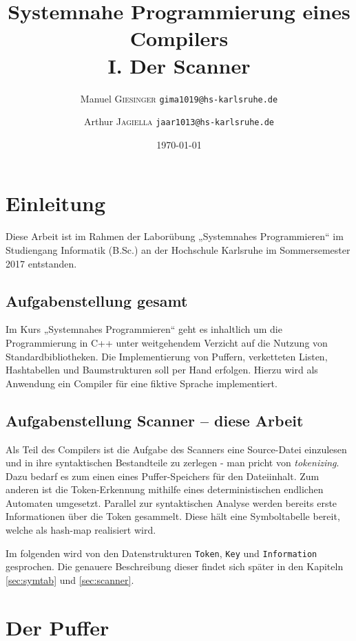 \documentclass[
a4paper,   %
11pt,      %
oneside,   %
onecolumn, %
final      %
]{article}
\title{Systemnahe Programmierung eines Compilers\\I. Der Scanner}
\author{
Manuel \textsc{Giesinger} \hspace{1cm} \texttt{gima1019@hs-karlsruhe.de}
\and
Arthur \textsc{Jagiella} \hspace{1.35cm} \texttt{jaar1013@hs-karlsruhe.de}
}
\date{\today}
\newcommand{\code}[1]{\lstinline$#1$}
\begin{document}
\maketitle
\newpage

\tableofcontents
\newpage



\section{Einleitung} %
Diese Arbeit ist im Rahmen der Laborübung „Systemnahes Programmieren“ im Studiengang Informatik (B.Sc.) an der Hochschule Karlsruhe im Sommersemester 2017 entstanden. 

\subsection{Aufgabenstellung gesamt}
Im Kurs „Systemnahes Programmieren“ geht es inhaltlich um die Programmierung in C++ unter weitgehendem Verzicht auf die Nutzung von Standardbibliotheken. Die Implementierung von Puffern, verketteten Listen, Hashtabellen und Baumstrukturen soll per Hand erfolgen. Hierzu wird als Anwendung ein Compiler für eine fiktive Sprache implementiert.

\subsection{Aufgabenstellung Scanner -- diese Arbeit} 
Als Teil des Compilers ist die Aufgabe des Scanners eine Source-Datei einzulesen und in ihre syntaktischen Bestandteile zu zerlegen - man pricht von \emph{tokenizing}. Dazu bedarf es zum einen eines Puffer-Speichers für den Dateiinhalt. Zum anderen ist die Token-Erkennung mithilfe eines deterministischen endlichen Automaten umgesetzt.
Parallel zur syntaktischen Analyse werden bereits erste Informationen über die Token gesammelt. Diese hält eine Symboltabelle bereit, welche als hash-map realisiert wird.

Im folgenden wird von den Datenstrukturen \code{Token}, \code{Key} und \code{Information} gesprochen. Die genauere Beschreibung dieser findet sich später in den Kapiteln \ref{sec:symtab} und \ref{sec:scanner}.

\section{Der Puffer}
\end{document}
